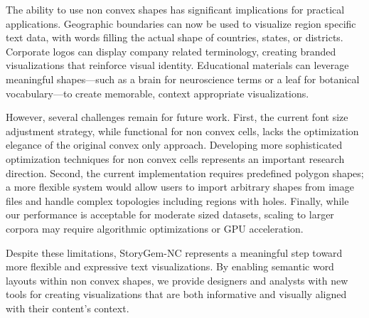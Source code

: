 \documentclass{vgtc}                          %
\begin{document}
The ability to use non convex shapes has significant implications for practical applications.
Geographic boundaries can now be used to visualize region specific text data, with words filling the actual shape of countries, states, or districts.
Corporate logos can display company related terminology, creating branded visualizations that reinforce visual identity.
Educational materials can leverage meaningful shapes—such as a brain for neuroscience terms or a leaf for botanical vocabulary—to create memorable, context appropriate visualizations.

However, several challenges remain for future work.
First, the current font size adjustment strategy, while functional for non convex cells, lacks the optimization elegance of the original convex only approach.
Developing more sophisticated optimization techniques for non convex cells represents an important research direction.
Second, the current implementation requires predefined polygon shapes; a more flexible system would allow users to import arbitrary shapes from image files and handle complex topologies including regions with holes.
Finally, while our performance is acceptable for moderate sized datasets, scaling to larger corpora may require algorithmic optimizations or GPU acceleration.

Despite these limitations, StoryGem-NC represents a meaningful step toward more flexible and expressive text visualizations.
By enabling semantic word layouts within non convex shapes, we provide designers and analysts with new tools for creating visualizations that are both informative and visually aligned with their content's context.



\end{document}
